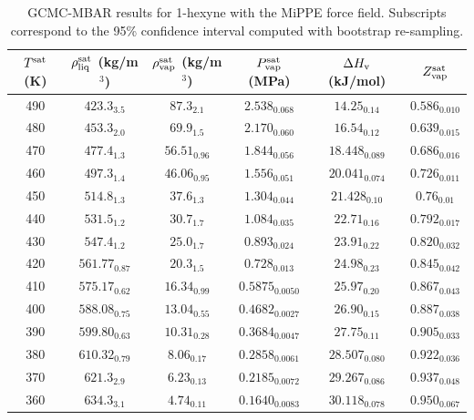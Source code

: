 \documentclass[journal=jctc,manuscript=article]{achemso}
\begin{document}
\begin{table}[htb!]
	\caption{GCMC-MBAR results for 1-hexyne with the MiPPE force field. Subscripts correspond to the 95\% confidence interval computed with bootstrap re-sampling.}
	\begin{center}
		\begin{tabular}{|c|c|c|c|c|c|}
			\hline
			$T^{\rm sat}$ (K) & $\rho_{\rm liq}^{\rm sat}$ (kg/m$^3$) & $\rho_{\rm vap}^{\rm sat}$ (kg/m$^3$) & $P_{\rm vap}^{\rm sat}$ (MPa) & $\Delta H_{\rm v}$ (kJ/mol) & $Z_{\rm vap}^{\rm sat}$ \\ \hline
			490 & $423.3_{3.5}$ & $87.3_{2.1}$ & $2.538_{0.068}$ & $14.25_{0.14}$ & $0.586_{0.010}$ \\
			480 & $453.3_{2.0}$ & $69.9_{1.5}$ & $2.170_{0.060}$ & $16.54_{0.12}$ & $0.639_{0.015}$ \\
			470 & $477.4_{1.3}$ & $56.51_{0.96}$ & $1.844_{0.056}$ & $18.448_{0.089}$ & $0.686_{0.016}$ \\
			460 & $497.3_{1.4}$ & $46.06_{0.95}$ & $1.556_{0.051}$ & $20.041_{0.074}$ & $0.726_{0.011}$ \\
			450 & $514.8_{1.3}$ & $37.6_{1.3}$ & $1.304_{0.044}$ & $21.428_{0.10}$ & $0.76_{0.01}$ \\
			440 & $531.5_{1.2}$ & $30.7_{1.7}$ & $1.084_{0.035}$ & $22.71_{0.16}$ & $0.792_{0.017}$ \\
			430 & $547.4_{1.2}$ & $25.0_{1.7}$ & $0.893_{0.024}$ & $23.91_{0.22}$ & $0.820_{0.032}$ \\
			420 & $561.77_{0.87}$ & $20.3_{1.5}$ & $0.728_{0.013}$ & $24.98_{0.23}$ & $0.845_{0.042}$ \\
			410 & $575.17_{0.62}$ & $16.34_{0.99}$ & $0.5875_{0.0050}$ & $25.97_{0.20}$ & $0.867_{0.043}$ \\
			400 & $588.08_{0.75}$ & $13.04_{0.55}$ & $0.4682_{0.0027}$ & $26.90_{0.15}$ & $0.887_{0.038}$ \\
			390 & $599.80_{0.63}$ & $10.31_{0.28}$ & $0.3684_{0.0047}$ & $27.75_{0.11}$ & $0.905_{0.033}$ \\
			380 & $610.32_{0.79}$ & $8.06_{0.17}$ & $0.2858_{0.0061}$ & $28.507_{0.080}$ & $0.922_{0.036}$ \\
			370 & $621.3_{2.9}$ & $6.23_{0.13}$ & $0.2185_{0.0072}$ & $29.267_{0.086}$ & $0.937_{0.048}$ \\
			360 & $634.3_{3.1}$ & $4.74_{0.11}$ & $0.1640_{0.0083}$ & $30.118_{0.078}$ & $0.950_{0.067}$ \\
			\hline
		\end{tabular}
	\end{center}
\end{table}
\end{document}
